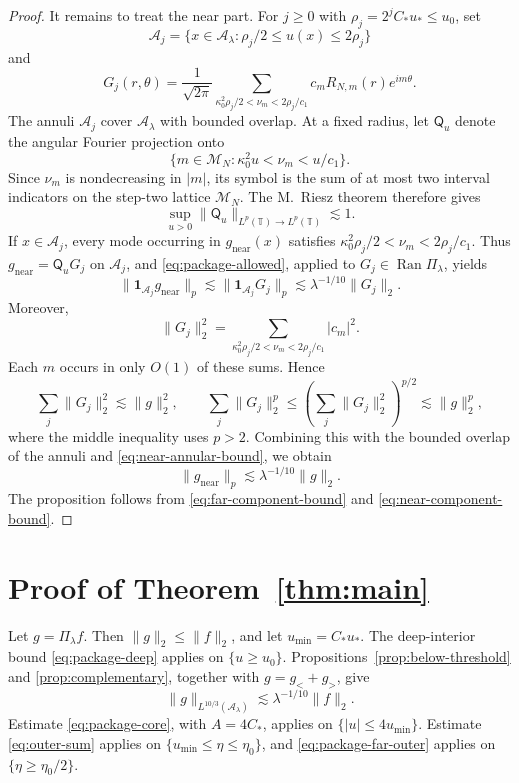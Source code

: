 \documentclass[11pt,a4paper]{amsart}
\numberwithin{equation}{section}
\newcommand{\T}{\mathbb T}
\newcommand{\one}{\mathbf 1}
\newcommand{\norm}[1]{\lVert #1\rVert}
\begin{document}
\begin{proof}
It remains to treat the near part. For \(j\ge0\) with
\(\rho_j=2^jC_*u_*\le u_0\), set
\[
 \mathcal A_j
 =\{x\in\mathcal A_\lambda:\rho_j/2\le u(x)\le2\rho_j\}
\]
and
\[
 G_j(r,\theta)=\frac1{\sqrt{2\pi}}
 \sum_{\kappa_0^2\rho_j/2<\nu_m<2\rho_j/c_1}
 c_mR_{N,m}(r)e^{im\theta}.
\]
The annuli \(\mathcal A_j\) cover \(\mathcal A_\lambda\) with bounded overlap.
At a fixed radius, let \(\mathsf Q_u\) denote the angular Fourier projection
onto
\[
 \{m\in\mathcal M_N:\kappa_0^2u<\nu_m<u/c_1\}.
\]
Since \(\nu_m\) is nondecreasing in \(|m|\), its symbol is the sum of at most
two interval indicators on the step-two lattice \(\mathcal M_N\). The
M.~Riesz theorem
\cite[Proposition~4.1.6 and Theorem~4.1.7]{Grafakos} therefore gives
\[
 \sup_{u>0}\norm{\mathsf Q_u}_{L^p(\T)\to L^p(\T)}\lesssim1.
\]
If \(x\in\mathcal A_j\), every mode occurring in
\(g_{\mathrm{near}}(x)\) satisfies $\kappa_0^2\rho_j/2<\nu_m<2\rho_j/c_1$.
Thus \(g_{\mathrm{near}}=\mathsf Q_uG_j\) on \(\mathcal A_j\), and
\eqref{eq:package-allowed}, applied to
\(G_j\in\operatorname{Ran}\Pi_\lambda\), yields
\begin{equation}\label{eq:near-annular-bound}
 \norm{\one_{\mathcal A_j}g_{\mathrm{near}}}_p
 \lesssim\norm{\one_{\mathcal A_j}G_j}_p
 \lesssim\lambda^{-1/10}\norm{G_j}_2.
\end{equation}
Moreover,
\[
 \norm{G_j}_2^2
 =\sum_{\kappa_0^2\rho_j/2<\nu_m<2\rho_j/c_1}|c_m|^2.
\]
Each \(m\) occurs in only \(O(1)\) of these sums. Hence
\[
 \sum_j\norm{G_j}_2^2\lesssim\norm g_2^2,
 \qquad
 \sum_j\norm{G_j}_2^p
 \le\left(\sum_j\norm{G_j}_2^2\right)^{p/2}
 \lesssim\norm g_2^p,
\]
where the middle inequality uses \(p>2\). Combining this with the bounded
overlap of the annuli and \eqref{eq:near-annular-bound}, we obtain
\begin{equation}\label{eq:near-component-bound}
 \norm{g_{\mathrm{near}}}_p
 \lesssim\lambda^{-1/10}\norm g_2.
\end{equation}
The proposition follows from
\eqref{eq:far-component-bound} and \eqref{eq:near-component-bound}.
\end{proof}

\section{Proof of Theorem~\ref{thm:main}}\label{sec:proof-main}



Let \(g=\Pi_\lambda f\). Then
\(\norm g_2\le\norm f_2\), and let
\(u_{\mathrm{min}}=C_*u_*\).
The deep-interior bound \eqref{eq:package-deep} applies on \(\{u\ge u_0\}\).
Propositions~\ref{prop:below-threshold} and
\ref{prop:complementary}, together with
\(g=g_{<}+g_{>}\), give
\[
 \norm g_{L^{10/3}(\mathcal A_\lambda)}
 \lesssim\lambda^{-1/10}\norm f_2.
\]
Estimate \eqref{eq:package-core}, with \(A=4C_*\), applies on
\(\{|u|\le4u_{\mathrm{min}}\}\). Estimate \eqref{eq:outer-sum}
applies on \(\{u_{\mathrm{min}}\le\eta\le\eta_0\}\), and
\eqref{eq:package-far-outer} applies on
\(\{\eta\ge\eta_0/2\}\).
\end{document}
